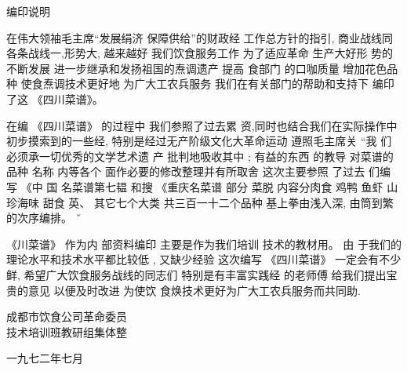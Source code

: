 \begin{center}
\Large
编印说明
\end{center}

在伟大领袖毛主席“发展绢济 保障供给”的财政经 工作总方针的指引, 商业战线同 各条战线一,形势大, 越来越好 我们饮食服务工作 为了适应革命 生产大好形 势的不断发展 进一步继承和发扬祖国的焘调遗产 提高 食部门 的口咖质量 增加花色品种 使食焘调技术更好地 为广大工农兵服务 我们在有关部门的帮助和支持下 编印 了这 《四川菜谱》。 

在编 《四川菜谱》 的过程中 我们参照了过去累 资,同时也结合我们在实际操作中初步摸索到的一些经, 特别是经过无产阶级文化大革命运动 遵照毛主席关 “我 们必须承一切优秀的文学艺术遗 产 批判地吸收其中 ; 有益的东西 的教导 对菜谱的品种 名称 内等各个 面作必要的修改整理并有所取舍 这次主要参照 了过去 们编 写 《中 国 名菜谱第七韫 和搜 《重庆名菜谱 部分 菜脱 内容分肉食 鸡鸭 鱼虾 山珍海味 甜食 英、 其它七个大类 共三百一十二个品种 基上拳由浅入深, 由筒到繁的次序编排。 ˇ 

《川菜谱》 作为内 部资料编印 主要是作为我们培训 技术的教材用。 由 于我们的理论水平和技术水平都比较低 , 又缺少经验 这次编写 《四川菜谱》 一定会有不少鲜, 希望广大饮食服务战线的同志们 特别是有丰富实践经 的老师傅 给我们提出宝贵的意见 以便及时改进 为使饮 食焕技术更好为广大工农兵服务而共同助. 

\begin{flushright}
成都市饮食公司革命委员\\
技术培训班教研组集体整

一九七二年七月
\end{flushright}
